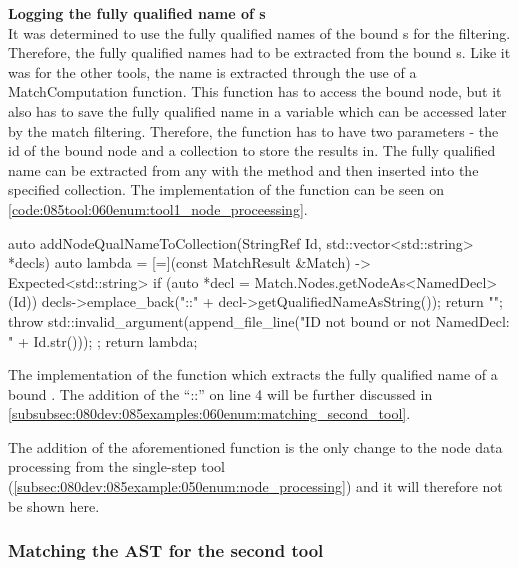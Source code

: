 \textbf{Logging the fully qualified name of s}\\
It was determined to use the fully qualified names of the bound s for the filtering. 
Therefore, the fully qualified names had to be extracted from the bound s. 
Like it was for the other tools, the name is extracted through the use of a MatchComputation function. 
This function has to access the bound  node, but it also has to save the fully qualified name in a variable which can be accessed later by the match filtering. 
Therefore, the function has to have two parameters - the id of the bound node and a collection to store the results in. 
The fully qualified name can be extracted from any  with the method  and then inserted into the specified collection. 
The implementation of the function can be seen on \cref{code:085tool:060enum:tool1_node_proceessing}.

\begin{listing}[H]
  \begin{cppcode}
auto addNodeQualNameToCollection(StringRef Id, std::vector<std::string> *decls) {
	auto lambda = [=](const MatchResult &Match) -> Expected<std::string> {
		if (auto *decl = Match.Nodes.getNodeAs<NamedDecl>(Id)) {
			decls->emplace_back("::" + decl->getQualifiedNameAsString());
			return "";
		}
		throw std::invalid_argument(append_file_line("ID not bound or not NamedDecl: " + Id.str()));
	};
	return lambda;
}
  \end{cppcode}
  \caption{The implementation of the function which extracts the fully qualified name of a bound . The addition of the ``::'' on line 4 will be further discussed in \cref{subsubsec:080dev:085examples:060enum:matching_second_tool}.}
  \label{code:085tool:060enum:tool1_node_proceessing}
\end{listing}

The addition of the aforementioned  function is the only change to the node data processing from the single-step tool (\cref{subsec:080dev:085example:050enum:node_processing}) and it will therefore not be shown here.


\subsubsection*{Matching the AST for the second tool} \label{subsubsec:080dev:085examples:060enum:matching_second_tool}

